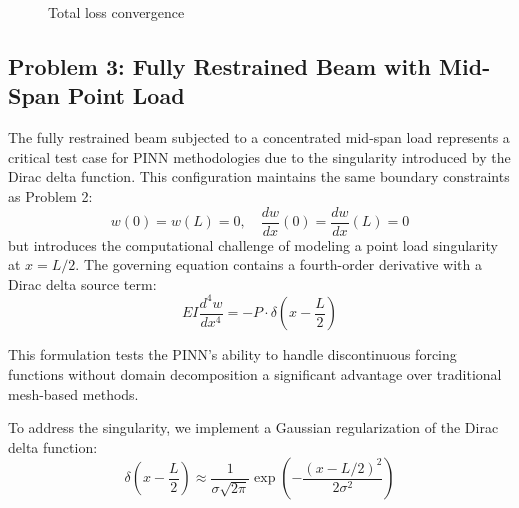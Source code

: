 \documentclass[twocolumn]{svjour3}
\begin{document}
	\begin{figure}[htbp]
		\centering
		\caption{Total loss convergence}\label{fig:restrained_convergence}
	\end{figure}
	
	\subsection{Problem 3: Fully Restrained Beam with Mid-Span Point Load}
	
	The fully restrained beam subjected to a concentrated mid-span load represents a critical test case for PINN methodologies due to the singularity introduced by the Dirac delta function. This configuration maintains the same boundary constraints as Problem 2:
	\begin{equation}		
	w(0) = w(L) = 0, \quad \frac{dw}{dx}(0) = \frac{dw}{dx}(L) = 0
	\label{eq:118}
	\end{equation}
	but introduces the computational challenge of modeling a point load singularity at $x = L/2$. The governing equation contains a fourth-order derivative with a Dirac delta source term:
	\begin{equation}
	EI \frac{d^4 w}{dx^4} = -P \cdot \delta\left(x - \frac{L}{2}\right)
	\label{eq:119}
	\end{equation}

	This formulation tests the PINN's ability to handle discontinuous forcing functions without domain decomposition a significant advantage over traditional mesh-based methods.
	
	To address the singularity, we implement a Gaussian regularization of the Dirac delta function:
	\begin{equation}
	\delta\left(x - \frac{L}{2}\right) \approx \frac{1}{\sigma\sqrt{2\pi}} \exp\left(-\frac{(x - L/2)^2}{2\sigma^2}\right)
	\label{eq:120}
	\end{equation}
	
\end{document}
